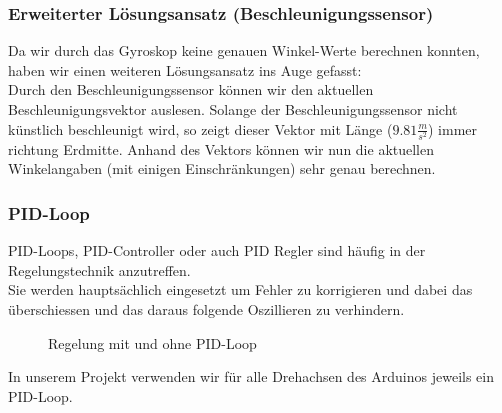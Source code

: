 \subsubsection{Erweiterter Lösungsansatz (Beschleunigungssensor)}
Da wir durch das Gyroskop keine genauen Winkel-Werte berechnen konnten, haben wir einen weiteren Lösungsansatz ins Auge gefasst:\\
Durch den Beschleunigungssensor können wir den aktuellen Beschleunigungsvektor auslesen. Solange der Beschleunigungssensor nicht künstlich beschleunigt wird, 
so zeigt dieser Vektor mit Länge (\begin{math}9.81\frac{m}{s^2}\end{math}) immer richtung Erdmitte. Anhand des Vektors können wir nun die aktuellen Winkelangaben (mit einigen Einschränkungen) sehr genau berechnen.



\subsubsection{PID-Loop}
PID-Loops, PID-Controller oder auch PID Regler sind häufig in der Regelungstechnik anzutreffen.\\
Sie werden hauptsächlich eingesetzt um Fehler zu korrigieren und dabei das überschiessen und das daraus folgende Oszillieren zu verhindern.\\

\begin{figure}[H]
\centering
{}
  \caption{Regelung mit und ohne PID-Loop}
\end{figure}

In unserem Projekt verwenden wir für alle Drehachsen des Arduinos jeweils ein PID-Loop. 



